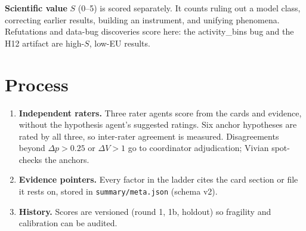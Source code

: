 \documentclass[aps,pre,reprint,10pt,nofootinbib]{revtex4-2}
\begin{document}
\textbf{Scientific value} $S$ (0--5) is scored separately. It counts ruling out a model class, correcting earlier results, building an instrument, and unifying phenomena. Refutations and data-bug discoveries score here: the activity\_bins bug and the H12 artifact are high-$S$, low-EU results.

\section{Process}
\begin{enumerate}
\item \textbf{Independent raters.} Three rater agents score from the cards and evidence, without the hypothesis agent's suggested ratings. Six anchor hypotheses are rated by all three, so inter-rater agreement is measured. Disagreements beyond $\Delta p>0.25$ or $\Delta V>1$ go to coordinator adjudication; Vivian spot-checks the anchors.
\item \textbf{Evidence pointers.} Every factor in the ladder cites the card section or file it rests on, stored in \texttt{summary/meta.json} (schema v2).
\item \textbf{History.} Scores are versioned (round 1, 1b, holdout) so fragility and calibration can be audited.
\end{enumerate}
\end{document}
